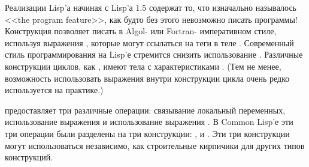 Реализации Lisp'а начиная с Lisp'а 1.5 содержат то, что изначально называлось
<<the program feature>>, как будто без этого невозможно писать программы!
Конструкция  позволяет писать в Algol- или Fortran- императивном
стиле, используя выражения , которые могут ссылаться на теги в теле
. Современный стиль программирования на Lisp'е стремится снизить
использование . Различные конструкции циклов, как , имеют тела
с характеристиками .
(Тем не менее, возможность использовать выражения  внутри конструкции
цикла очень редко используется на практике.)

 предоставляет три различные операции:
связывание локальный переменных,
использование выражения 
и использование выражения .
В Common Lisp'е эти три операции были разделены на три конструкции:
,  и .
Эти три конструкции могут использоваться независимо, как строительные кирпичики
для других типов конструкций.


